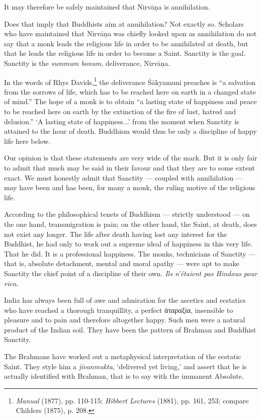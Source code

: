 \documentclass[a4paper, 11pt, oneside, english, landscape]{article}
\begin{document}
It may therefore be safely maintained that Nirvāṇa is annihilation.

Does that imply that Buddhists aim at annihilation? Not exactly so. Scholars who have maintained that Nirvāṇa was chiefly looked upon as annihilation do not say that a monk leads the religious life in order to be annihilated at death, but that he leads the religious life in order to become a Saint. Sanctity is the goal. Sanctity is the \emph{summum bonum}, deliverance, Nirvāṇa.

In the words of Rhys Davids,\footnote{\emph{Manual} (1877), pp. 110-115; \emph{Hibbert Lectures} (1881), pp. 161, 253; compare Childers (1875), p. 208.} the deliverance Śākyamuni preaches is ``a salvation from the sorrows of life, which has to be reached here on earth in a changed state of mind.'' The hope of a monk is to obtain ``a lasting state of happiness and peace to be reached here on earth by the extinction of the fire of lust, hatred and delusion.'' `A lasting state of happiness...' from the moment when Sanctity is attained to the hour of death. Buddhism would thus be only a discipline of happy life here below.

Our opinion is that these statements are very wide of the mark. But it is only fair to admit that much may be said in their favour and that they are to some extent exact. We must honestly admit that Sanctity --- coupled with annihilation --- may have been and has been, for many a monk, the ruling motive of the religious life.

According to the philosophical tenets of Buddhism --- strictly understood --- on the one hand, transmigration is pain; on the other hand, the Saint, at death, does not exist any longer. The life after death having lost any interest for the Buddhist, he had only to work out a supreme ideal of happiness in this very life. That he did. It is a professional happiness. The monks, technicians of Sanctity --- that is, absolute detachment, mental and moral apathy --- were apt to make Sanctity the chief point of a discipline of their own. \emph{Ils n'étaient pas Hindous pour rien.}

India has always been full of awe and admiration for the ascetics and ecstatics who have reached a thorough tranquillity, a perfect ἀταραξία, insensible to pleasure and to pain and therefore altogether happy. Such men were a natural product of the Indian soil. They have been the pattern of Brahman and Buddhist Sanctity.

The Brahmans have worked out a metaphysical interpretation of the ecstatic Saint. They style him a \emph{jīvanmukta}, `delivered yet living,' and assert that he is actually identified with Brahman, that is to say with the immanent Absolute.
\end{document}

